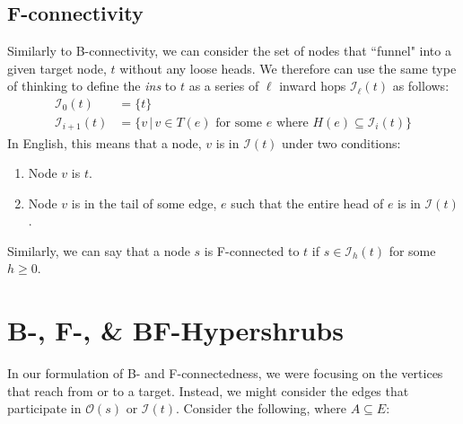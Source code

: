 \documentclass[12pt,twoside]{reedthesis}
\theoremstyle{definition}
\begin{document}
\subsection{F-connectivity}
Similarly to B-connectivity, we can consider the set of nodes that ``funnel" into a given target node, $t$ without any loose heads. We therefore can use the same type of thinking to define the \textit{ins} to $t$ as a series of $\ell$ inward hops $\mathcal{I}_\ell(t)$ as follows:
\begin{align*}
  \mathcal{I}_0(t)&=\{t\}\\
  \mathcal{I}_{i+1}(t)&=\{v \,|\, v \in T(e) \text{ for some } e \text{ where } H(e) \subseteq \mathcal{I}_i(t)\}
\end{align*}
In English, this means that a node, $v$ is in $\mathcal{I}(t)$ under two conditions:
\begin{enumerate}
  \item{Node $v$ is $t$.}
  \item{Node $v$ is in the tail of some edge, $e$ such that the entire head of $e$ is in $\mathcal{I}(t)$.}
\end{enumerate}
Similarly, we can say that a node $s$ is F-connected to $t$ if $s \in \mathcal{I}_h(t)$ for some $h \geq 0$.

\section{B-, F-, \& BF-Hypershrubs}
In our formulation of B- and F-connectedness, we were focusing on the vertices that reach from or to a target. Instead, we might consider the edges that participate in $\mathcal{O}(s)$ or $\mathcal{I}(t)$. Consider the following, where $A \subseteq E$:
\end{document}
